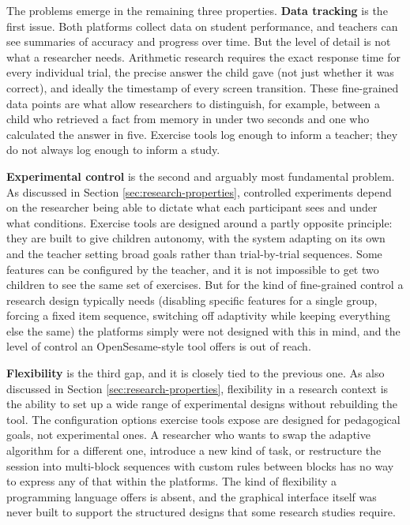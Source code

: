 The problems emerge in the remaining three properties. \textbf{Data tracking} is the first issue. Both platforms collect data on student performance, and teachers can see summaries of accuracy and progress over time. But the level of detail is not what a researcher needs. Arithmetic research requires the exact response time for every individual trial, the precise answer the child gave (not just whether it was correct), and ideally the timestamp of every screen transition. These fine-grained data points are what allow researchers to distinguish, for example, between a child who retrieved a fact from memory in under two seconds and one who calculated the answer in five. Exercise tools log enough to inform a teacher; they do not always log enough to inform a study.

\textbf{Experimental control} is the second and arguably most fundamental problem. As discussed in Section \ref{sec:research-properties}, controlled experiments depend on the researcher being able to dictate what each participant sees and under what conditions. Exercise tools are designed around a partly opposite principle: they are built to give children autonomy, with the system adapting on its own and the teacher setting broad goals rather than trial-by-trial sequences. Some features can be configured by the teacher, and it is not impossible to get two children to see the same set of exercises. But for the kind of fine-grained control a research design typically needs (disabling specific features for a single group, forcing a fixed item sequence, switching off adaptivity while keeping everything else the same) the platforms simply were not designed with this in mind, and the level of control an OpenSesame-style tool offers is out of reach.

\textbf{Flexibility} is the third gap, and it is closely tied to the previous one. As also discussed in Section \ref{sec:research-properties}, flexibility in a research context is the ability to set up a wide range of experimental designs without rebuilding the tool. The configuration options exercise tools expose are designed for pedagogical goals, not experimental ones. A researcher who wants to swap the adaptive algorithm for a different one, introduce a new kind of task, or restructure the session into multi-block sequences with custom rules between blocks has no way to express any of that within the platforms. The kind of flexibility a programming language offers is absent, and the graphical interface itself was never built to support the structured designs that some research studies require.


